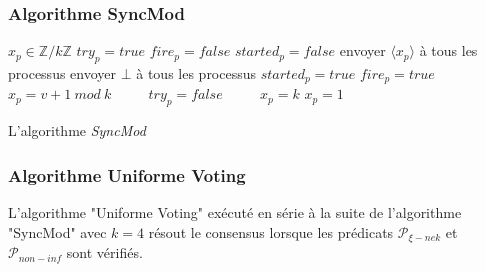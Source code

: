 \documentclass{beamer}
\begin{document}
\begin{frame}
\frametitle{Algorithme SyncMod}
\begin{algorithm}[H]
\tiny{
\begin{distribalgo}[1]
	\STATE $x_p \in \mathds{Z}/k\mathds{Z}$
	\STATE $try_p = true$
	\STATE $fire_p = false$
	\STATE $started_p = false$
\ENDINDENT 
{}
			\STATE envoyer $\langle x_p \rangle$ à tous les processus
		\ELSE
			\STATE envoyer $\bot$ à tous les processus
		\ENDIF
	\ENDINDENT
		\STATE $started_p = true$
			\STATE $fire_p = true$ ~~~~
		\ENDIF
			\STATE $x_p = v+1~mod~k$ ~~~~
			\STATE $try_p = false$ ~~~~
			\STATE $x_p = k$
		\ELSE
			\STATE $x_p = 1$ ~~~~
		\ENDIF
	\ENDINDENT
\ENDINDENT 
\caption{L'algorithme {\em SyncMod}} \label{algo:R}
\end{distribalgo}
}
\end{algorithm}
\end{frame}

\begin{frame}
\frametitle{Algorithme Uniforme Voting}
\begin{theorem}
	L'algorithme "Uniforme Voting" exécuté en série à la suite de l'algorithme "SyncMod" avec $k = 4$
	résout le consensus lorsque les prédicats $\mathcal{P}_{\xi-nek}$ et $\mathcal{P}_{non-inf}$ sont vérifiés.
\end{theorem}
\end{frame}
\end{document}
